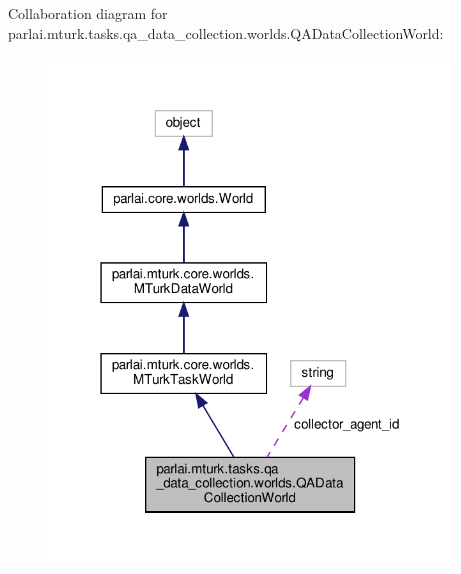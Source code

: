 Collaboration diagram for parlai.\+mturk.\+tasks.\+qa\+\_\+data\+\_\+collection.\+worlds.\+Q\+A\+Data\+Collection\+World\+:
\nopagebreak
\begin{figure}[H]
\begin{center}
\leavevmode
\includegraphics[width=304pt]{classparlai_1_1mturk_1_1tasks_1_1qa__data__collection_1_1worlds_1_1QADataCollectionWorld__coll__graph}
\end{center}
\end{figure}
